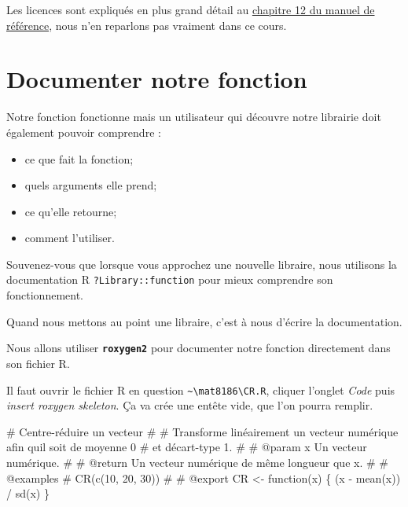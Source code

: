 \documentclass[
  letterpaper,
  DIV=11,
  numbers=noendperiod]{scrreprt}
\newenvironment{Shaded}{\begin{snugshade}}{\end{snugshade}}
\newcommand{\CommentTok}[1]{\textcolor[rgb]{0.37,0.37,0.37}{#1}}
\newcommand{\ControlFlowTok}[1]{\textcolor[rgb]{0.00,0.23,0.31}{#1}}
\newcommand{\FunctionTok}[1]{\textcolor[rgb]{0.28,0.35,0.67}{#1}}
\newcommand{\NormalTok}[1]{\textcolor[rgb]{0.00,0.23,0.31}{#1}}
\newcommand{\OtherTok}[1]{\textcolor[rgb]{0.00,0.23,0.31}{#1}}
\newcommand{\SpecialCharTok}[1]{\textcolor[rgb]{0.37,0.37,0.37}{#1}}
\providecommand{\tightlist}{%
  \setlength{\itemsep}{0pt}\setlength{\parskip}{0pt}}\usepackage{longtable,booktabs,array}
\begin{document}
Les licences sont expliqués en plus grand détail au
\href{https://r-pkgs.org/license.html}{chapitre 12 du manuel de
référence}, nous n'en reparlons pas vraiment dans ce cours.

\section{Documenter notre fonction}\label{documenter-notre-fonction}

Notre fonction fonctionne mais un utilisateur qui découvre notre
librairie doit également pouvoir comprendre :

\begin{itemize}
\tightlist
\item
  ce que fait la fonction;
\item
  quels arguments elle prend;
\item
  ce qu'elle retourne;
\item
  comment l'utiliser.
\end{itemize}

Souvenez-vous que lorsque vous approchez une nouvelle libraire, nous
utilisons la documentation R \texttt{?Library::function} pour mieux
comprendre son fonctionnement.

Quand nous mettons au point une libraire, c'est à nous d'écrire la
documentation.

Nous allons utiliser \textbf{\texttt{roxygen2}} pour documenter notre
fonction directement dans son fichier R.

Il faut ouvrir le fichier R en question
\texttt{\textasciitilde{}\textbackslash{}mat8186\textbackslash{}CR.R},
cliquer l'onglet \emph{Code} puis \emph{insert roxygen skeleton}. Ça va
crée une entête vide, que l'on pourra remplir.

\begin{Shaded}
\begin{Highlighting}[]
\CommentTok{\#\textquotesingle{} Centre{-}réduire un vecteur}
\CommentTok{\#\textquotesingle{}}
\CommentTok{\#\textquotesingle{} Transforme linéairement un vecteur numérique afin qu\textquotesingle{}il soit de moyenne 0}
\CommentTok{\#\textquotesingle{} et d\textquotesingle{}écart{-}type 1.}
\CommentTok{\#\textquotesingle{}}
\CommentTok{\#\textquotesingle{} @param x Un vecteur numérique.}
\CommentTok{\#\textquotesingle{}}
\CommentTok{\#\textquotesingle{} @return Un vecteur numérique de même longueur que \textasciigrave{}x\textasciigrave{}.}
\CommentTok{\#\textquotesingle{}}
\CommentTok{\#\textquotesingle{} @examples}
\CommentTok{\#\textquotesingle{} CR(c(10, 20, 30))}
\CommentTok{\#\textquotesingle{}}
\CommentTok{\#\textquotesingle{} @export}
\NormalTok{CR }\OtherTok{\textless{}{-}} \ControlFlowTok{function}\NormalTok{(x) \{}
\NormalTok{  (x }\SpecialCharTok{{-}} \FunctionTok{mean}\NormalTok{(x)) }\SpecialCharTok{/} \FunctionTok{sd}\NormalTok{(x)}
\NormalTok{\}}
\end{Highlighting}
\end{Shaded}
\end{document}
